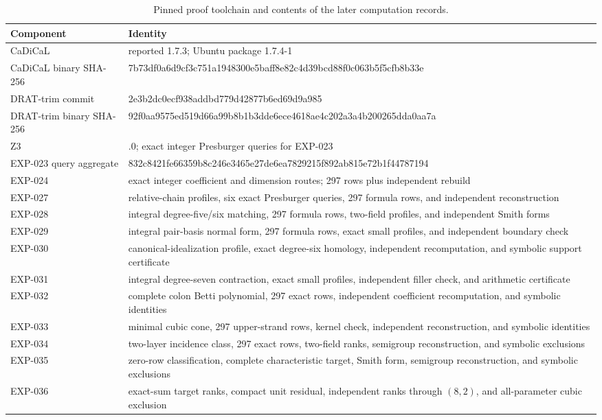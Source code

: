 \documentclass[11pt]{article}
\theoremstyle{definition}
\theoremstyle{remark}
\begin{document}
\begin{table}[tb]
\centering
\caption{Pinned proof toolchain and contents of the later computation records.}
\label{tab:toolchain}
\begin{tabular}{@{}l>{\raggedright\arraybackslash}p{}@{}}
\toprule
Component & Identity\\
\midrule
CaDiCaL & reported 1.7.3; Ubuntu package 1.7.4-1\\
CaDiCaL binary SHA-256 & {\fontsize{7}{8}\selectfont\ttfamily 7b73df0a6d9cf3c751a1948300e5baff8e82c4d39bcd88f0c063b5f5cfb8b33e}\\
DRAT-trim commit & {\fontsize{7}{8}\selectfont\ttfamily 2e3b2dc0ecf938addbd779d42877b6ed69d9a985}\\
DRAT-trim binary SHA-256 & {\fontsize{7}{8}\selectfont\ttfamily 92f0aa9575ed519d66a99b8b1b3dde6ece4618ae4c202a3a4b200265dda0aa7a}\\
Z3 & 4.16.0; exact integer Presburger queries for EXP-023\\
EXP-023 query aggregate & {\fontsize{7}{8}\selectfont\ttfamily 832c8421fe66359b8c246e3465e27de6ea7829215f892ab815e72b1f44787194}\\
EXP-024 & exact integer coefficient and dimension routes; 297 rows plus independent rebuild\\
EXP-027 & relative-chain profiles, six exact Presburger queries, 297 formula rows, and independent reconstruction\\
EXP-028 & integral degree-five/six matching, 297 formula rows, two-field profiles, and independent Smith forms\\
EXP-029 & integral pair-basis normal form, 297 formula rows, exact small profiles, and independent boundary check\\
EXP-030 & canonical-idealization profile, exact degree-six homology, independent recomputation, and symbolic support certificate\\
EXP-031 & integral degree-seven contraction, exact small profiles, independent filler check, and arithmetic certificate\\
EXP-032 & complete colon Betti polynomial, 297 exact rows, independent coefficient recomputation, and symbolic identities\\
EXP-033 & minimal cubic cone, 297 upper-strand rows, kernel check, independent reconstruction, and symbolic identities\\
EXP-034 & two-layer incidence class, 297 exact rows, two-field ranks, semigroup reconstruction, and symbolic exclusions\\
EXP-035 & zero-row classification, complete characteristic target, Smith form, semigroup reconstruction, and symbolic exclusions\\
EXP-036 & exact-sum target ranks, compact unit residual, independent ranks through $(8,2)$, and all-parameter cubic exclusion\\
\bottomrule
\end{tabular}
\end{table}
\end{document}

